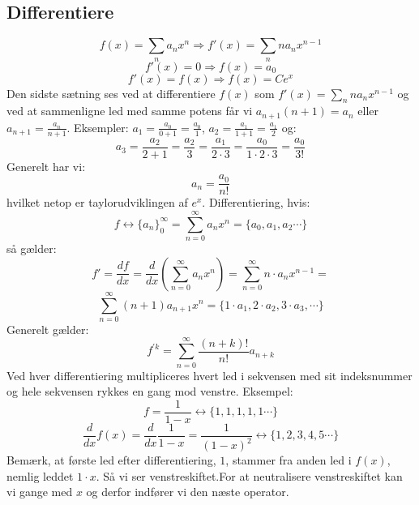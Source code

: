 \subsection*{Differentiere}
\[f(x)=\sum_{n}a_{n}x^{n} \Rightarrow f'(x)=\sum_{n}na_{n}x^{n-1}\]
\[f'(x)=0 \Rightarrow f(x)=a_{0}\]
\[f'(x)=f(x) \Rightarrow f(x)=Ce^{x}\]
Den sidste sætning ses ved at differentiere \(f(x)\) som \(f'(x)=\sum_{n}na_{n}x^{n-1}\) og ved at sammenligne led med samme potens får vi \(a_{n+1}(n+1)=a_{n}\) eller \(a_{n+1}=\frac{a_{n}}{n+1}\). Eksempler: \(a_{1}=\frac{a_{0}}{0+1}=\frac{a_{0}}{1}\),  \(a_{2}=\frac{a_{1}}{1+1}=\frac{a_{1}}{2}\) og: 
\[a_{3}=\frac{a_{2}}{2+1}=\frac{a_{2}}{3}=\frac{a_{1}}{2 \cdot 3}=\frac{a_{0}}{1 \cdot 2 \cdot 3}=\frac{a_{0}}{3!}\]
Generelt har vi:
\[a_{n}=\frac{a_{0}}{n!}\]
hvilket netop er taylorudviklingen af \(e^{x}\).
Differentiering, hvis:
\[f \leftrightarrow \{a_{n}\}_{0}^{\infty}=\sum_{n=0}^{\infty}a_{n}x^{n}=\{a_{0},a_{1},a_{2} \dotsm\}\]
så gælder:
\[f'=\frac{df}{dx}=\frac{d}{dx}(\sum_{n=0}^{\infty}a_{n}x^{n})=\sum_{n=0}^{\infty}n \cdot a_{n}x^{n-1}=\]
\[\sum_{n=0}^{\infty}(n+1)a_{n+1}x^{n}=\{1 \cdot a_{1}, 2 \cdot a_{2}, 3 \cdot a_{3}, \dotsm \}\]
Generelt gælder:
\[f^{'k}=\sum_{n=0}^{\infty}\frac{(n+k)!}{n!}a_{n+k}\]
Ved hver differentiering multipliceres hvert led i sekvensen med sit indeksnummer og hele sekvensen rykkes en gang mod venstre. Eksempel:
\[f=\frac{1}{1-x} \leftrightarrow \{1,1,1,1,1 \dotsm\}\]
\[\frac{d}{dx}f(x)=\frac{d}{dx}\frac{1}{1-x}=\frac{1}{(1-x)^{2}} \leftrightarrow \{1,2,3,4,5 \dotsm\}\]
Bemærk, at første led efter differentiering, \(1\), stammer fra anden led i \(f(x)\), nemlig leddet \(1 \cdot x\). Så vi ser venstreskiftet.For at neutralisere venstreskiftet kan vi gange med \(x\) og derfor indfører vi den næste operator.\\
